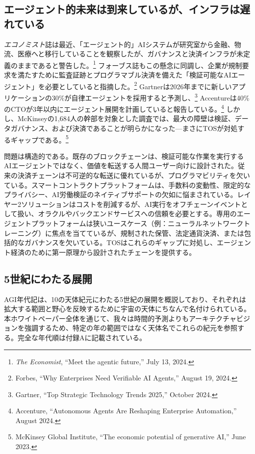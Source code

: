 \documentclass[11pt]{article}
\begin{document}
\subsection{エージェント的未来は到来しているが、インフラは遅れている}
\emph{エコノミスト}誌は最近、「エージェント的」AIシステムが研究室から金融、物流、医療へと移行していることを観察したが、ガバナンスと決済インフラが未定義のままであると警告した。\footnote{\emph{The Economist}, ``Meet the agentic future,'' July 13, 2024.} フォーブス誌もこの懸念に同調し、企業が規制要求を満たすために監査証跡とプログラマブル決済を備えた「検証可能なAIエージェント」を必要としていると指摘した。\footnote{Forbes, ``Why Enterprises Need Verifiable AI Agents,'' August 19, 2024.} Gartnerは2026年までに新しいアプリケーションの30\%が自律エージェントを採用すると予測し、\footnote{Gartner, ``Top Strategic Technology Trends 2025,'' October 2024.} Accentureは40\%のCTOが3年以内にエージェント展開を計画していると報告している。\footnote{Accenture, ``Autonomous Agents Are Reshaping Enterprise Automation,'' August 2024.} しかし、McKinseyの1,684人の幹部を対象とした調査では、最大の障壁は検証、データガバナンス、および決済であることが明らかになった---まさにTOSが対処するギャップである。\footnote{McKinsey Global Institute, ``The economic potential of generative AI,'' June 2023.}

問題は構造的である。既存のブロックチェーンは、検証可能な作業を実行するAIエージェントではなく、価値を転送する人間ユーザー向けに設計された。従来の決済チェーンは不可逆的な転送に優れているが、プログラマビリティを欠いている。スマートコントラクトプラットフォームは、手数料の変動性、限定的なプライバシー、AI労働検証のネイティブサポートの欠如に悩まされている。レイヤー2ソリューションはコストを削減するが、AI実行をオフチェーンイベントとして扱い、オラクルやバックエンドサービスへの信頼を必要とする。専用のエージェントプラットフォームは狭いユースケース（例：ニューラルネットワークトレーニング）に焦点を当てているが、規制された保管、法定通貨決済、または包括的なガバナンスを欠いている。TOSはこれらのギャップに対処し、エージェント経済のために第一原理から設計されたチェーンを提供する。

\subsection{5世紀にわたる展開}
AGI年代記は、10の天体紀元にわたる5世紀の展開を概説しており、それぞれは拡大する範囲と野心を反映するために宇宙の天体にちなんで名付けられている。本ホワイトペーパー全体を通じて、我々は時間的予測よりもアーキテクチャビジョンを強調するため、特定の年の範囲ではなく天体名でこれらの紀元を参照する。完全な年代順は付録Aに記載されている。
\end{document}
